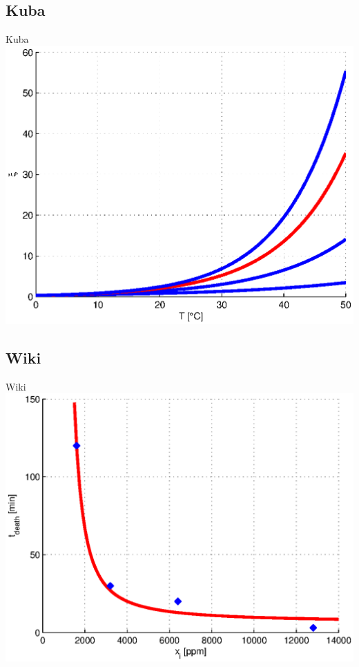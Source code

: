 \subsection{Kuba}
\begin{frame}{Kuba}
\includegraphics[width=\textwidth,height=0.8\textheight]{wykresy-kuba}
\end{frame}

\subsection{Wiki}
\begin{frame}{Wiki}
\includegraphics[width=\textwidth,height=0.8\textheight]{wykresy-wiki}
\end{frame}

